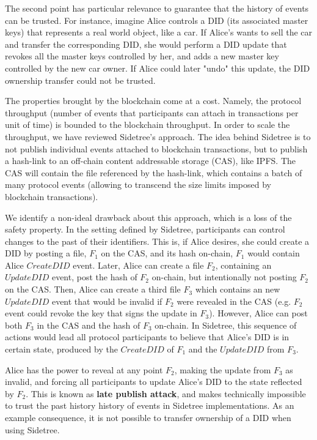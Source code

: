 \documentclass[10pt,a4paper]{article}
\begin{document}
The second point has particular relevance to guarantee that the history of events can be trusted. For instance, imagine Alice controls a DID (its 
associated master keys) that represents a real world object, like a car. If Alice's wants to sell the car and transfer the corresponding DID, she 
would perform a DID update that revokes all the master keys controlled by her, and adds a new master key controlled by the new car owner. If Alice 
could later "undo" this update, the DID ownership transfer could not be trusted.

The properties brought by the blockchain come at a cost. Namely, the protocol throughput (number of events that participants can attach in 
transactions per unit of time) is bounded to the blockchain throughput. In order to scale the throughput, we have reviewed Sidetree's approach. The 
idea behind Sidetree is to not publish individual events attached to blockchain transactions, but to publish a hash-link to an off-chain content 
addressable storage (CAS), like IPFS. The CAS will contain the file referenced by the hash-link, which contains a batch of many protocol events 
(allowing to transcend the size limits imposed by blockchain transactions).

We identify a non-ideal drawback about this approach, which is a loss of the safety property. In the setting defined by Sidetree, participants can 
control changes to the past of their identifiers. This is, if Alice desires, she could create a DID by posting a file, $F_{1}$ on the CAS, and its 
hash on-chain, $F_{1}$ would contain Alice $CreateDID$ event. Later, Alice can create a file $F_{2}$, containing an $UpdateDID$ event, post the hash 
of $F_{2}$ on-chain, but intentionally not posting $F_{2}$ on the CAS. Then, Alice can create a third file $F_{3}$ which contains an new $UpdateDID$
event that would be invalid if $F_{2}$ were revealed in the CAS (e.g. $F_{2}$ event could revoke the key that signs the update in $F_{3}$). However, 
Alice can post both $F_{3}$ in the CAS and the hash of $F_{3}$ on-chain. In Sidetree, this sequence of actions would lead all protocol participants 
to believe that Alice's DID is in certain state, produced by the $CreateDID$ of $F_{1}$ and the $UpdateDID$ from $F_{3}$.

Alice has the power to reveal at any point $F_{2}$, making the update from $F_{3}$ as invalid, and forcing all participants to update Alice's
DID to the state reflected by $F_{2}$. This is known as \textbf{late publish attack}, and makes technically impossible to trust the past history 
history of events in Sidetree implementations. As an example consequence, it is not possible to transfer ownership of a DID when using Sidetree.
\end{document}
